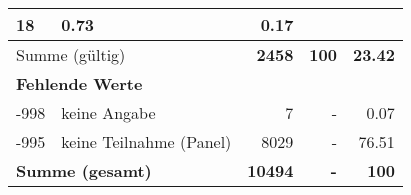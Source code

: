 \begin{longtable}{lXrrr}
       \num{18} &
       \num[round-mode=places,round-precision=2]{0,73} &
         \num[round-mode=places,round-precision=2]{0,17} \\
     \midrule
     \multicolumn{2}{l}{Summe (gültig)} &
       \textbf{\num{2458}} &
     \textbf{100} &
       \textbf{\num[round-mode=places,round-precision=2]{23,42}} \\
     \multicolumn{5}{l}{\textbf{Fehlende Werte}}\\
       -998 &
       keine Angabe &
         \num{7} &
        - &
         \num[round-mode=places,round-precision=2]{0,07} \\
       -995 &
       keine Teilnahme (Panel) &
         \num{8029} &
        - &
         \num[round-mode=places,round-precision=2]{76,51} \\
     \midrule
     \multicolumn{2}{l}{\textbf{Summe (gesamt)}} &
          \textbf{\num{10494}} &
        \textbf{-} &
        \textbf{100} \\
     \bottomrule
     \end{longtable}
     
